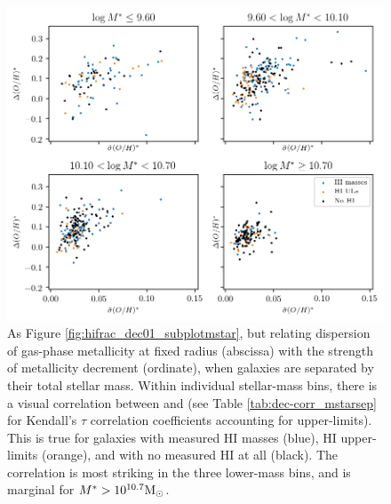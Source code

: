 \begin{figure}
    \centering
    \includegraphics[width=\textwidth]{madoh1_dec01_subplotmstar}
    \caption[As Figure \ref{fig:hifrac_dec01_subplotmstar}, but relating dispersion of gas-phase metallicity at fixed radius with the strength of metallicity decrement.]{\fixspacing As Figure \ref{fig:hifrac_dec01_subplotmstar}, but relating dispersion of gas-phase metallicity at fixed radius (abscissa) with the strength of metallicity decrement (ordinate), when galaxies are separated by their total stellar mass. Within individual stellar-mass bins, there is a visual correlation between \metdisp and \metdec (see Table \ref{tab:dec-corr_mstarsep} for Kendall's $\tau$ correlation coefficients accounting for upper-limits). This is true for galaxies with measured HI masses (blue), HI upper-limits (orange), and with no measured HI at all (black). The correlation is most striking in the three lower-mass bins, and is marginal for $M^* > 10^{10.7} {\rm M_{\odot}}$.}
    \label{fig:madoh1_dec01_subplotmstar}
\end{figure}

